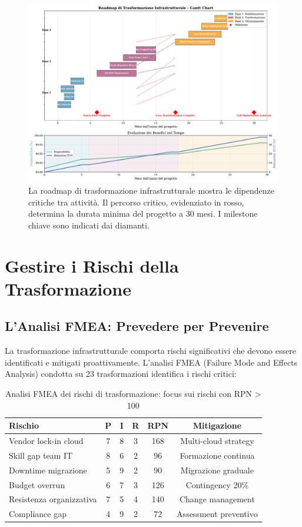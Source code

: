 \begin{figure}[htbp]
\centering
\includegraphics[width=\textwidth]{thesis_figures/cap3/figura_3_6_implementation_roadmap.pdf}
\caption{La roadmap di trasformazione infrastrutturale mostra le dipendenze critiche tra attività. Il percorso critico, evidenziato in rosso, determina la durata minima del progetto a 30 mesi. I milestone chiave sono indicati dai diamanti.}
\label{fig:roadmap}
\end{figure}

\section{Gestire i Rischi della Trasformazione}

\subsection{L'Analisi FMEA: Prevedere per Prevenire}

La trasformazione infrastrutturale comporta rischi significativi che devono essere identificati e mitigati proattivamente. L'analisi FMEA (Failure Mode and Effects Analysis) condotta su 23 trasformazioni identifica i rischi critici:

\begin{table}[htbp]
\centering
\caption{Analisi FMEA dei rischi di trasformazione: focus sui rischi con RPN > 100}
\label{tab:risk_analysis}
\begin{tabular}{lccccc}
\toprule
\textbf{Rischio} & \textbf{P} & \textbf{I} & \textbf{R} & \textbf{RPN} & \textbf{Mitigazione} \\
\midrule
Vendor lock-in cloud & 7 & 8 & 3 & 168 & Multi-cloud strategy \\
Skill gap team IT & 8 & 6 & 2 & 96 & Formazione continua \\
Downtime migrazione & 5 & 9 & 2 & 90 & Migrazione graduale \\
Budget overrun & 6 & 7 & 3 & 126 & Contingency 20\% \\
Resistenza organizzativa & 7 & 5 & 4 & 140 & Change management \\
Compliance gap & 4 & 9 & 2 & 72 & Assessment preventivo \\
\bottomrule
\end{tabular}
\end{table}

